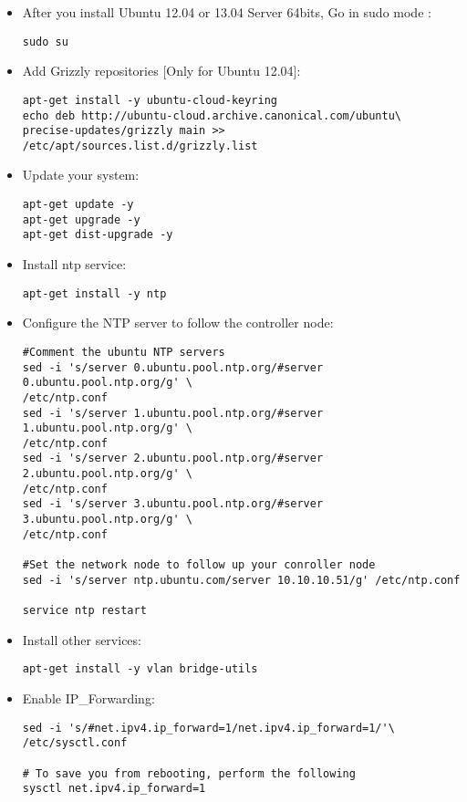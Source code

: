 \begin{itemize}
\item After you install Ubuntu 12.04 or 13.04 Server 64bits, Go in sudo mode : 

\begin{verbatim}
sudo su
\end{verbatim}


\item Add Grizzly repositories [Only for Ubuntu 12.04]:

\begin{verbatim}
apt-get install -y ubuntu-cloud-keyring 
echo deb http://ubuntu-cloud.archive.canonical.com/ubuntu\
precise-updates/grizzly main >> /etc/apt/sources.list.d/grizzly.list
\end{verbatim}


\item Update your system:

\begin{verbatim}
apt-get update -y
apt-get upgrade -y
apt-get dist-upgrade -y
\end{verbatim}


\item Install ntp service:

\begin{verbatim}
apt-get install -y ntp
\end{verbatim}


\item Configure the NTP server to follow the controller node:

\begin{verbatim}
#Comment the ubuntu NTP servers
sed -i 's/server 0.ubuntu.pool.ntp.org/#server 0.ubuntu.pool.ntp.org/g' \
/etc/ntp.conf
sed -i 's/server 1.ubuntu.pool.ntp.org/#server 1.ubuntu.pool.ntp.org/g' \
/etc/ntp.conf
sed -i 's/server 2.ubuntu.pool.ntp.org/#server 2.ubuntu.pool.ntp.org/g' \
/etc/ntp.conf
sed -i 's/server 3.ubuntu.pool.ntp.org/#server 3.ubuntu.pool.ntp.org/g' \
/etc/ntp.conf

#Set the network node to follow up your conroller node
sed -i 's/server ntp.ubuntu.com/server 10.10.10.51/g' /etc/ntp.conf

service ntp restart  
\end{verbatim}


\item Install other services:

\begin{verbatim}
apt-get install -y vlan bridge-utils
\end{verbatim}


\item Enable IP\_Forwarding:

\begin{verbatim}
sed -i 's/#net.ipv4.ip_forward=1/net.ipv4.ip_forward=1/'\
/etc/sysctl.conf

# To save you from rebooting, perform the following
sysctl net.ipv4.ip_forward=1
\end{verbatim}


\end{itemize}

